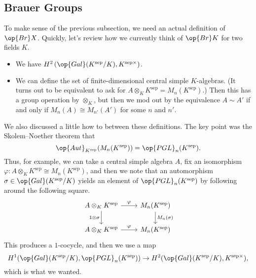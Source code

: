 \documentclass[../notes.tex]{subfiles}
\begin{document}
\subsection{Brauer Groups}
To make sense of the previous subsection, we need an actual definition of $\op{Br}X$. Quickly, let's review how we currently think of $\op{Br}K$ for two fields $K$.
\begin{itemize}
	\item We have $H^2\left(\op{Gal}(K^{\mathrm{sep}}/K),K^{\mathrm{sep}\times}\right)$.
	\item We can define the set of finite-dimensional central simple $K$-algebras. (It turns out to be equivalent to ask for $A\otimes_KK^{\mathrm{sep}}=M_n(K^{\mathrm{sep}})$.) Then this has a group operation by $\otimes_K$, but then we mod out by the equivalence $A\sim A'$ if and only if $M_n(A)\cong M_{n'}(A')$ for some $n$ and $n'$.
\end{itemize}
We also discussed a little how to between these definitions. The key point was the Skolem--Noether theorem that
\[\op{Aut}_{K^{\mathrm{sep}}}(M_n(K^{\mathrm{sep}}))=\op{PGL}_n(K^{\mathrm{sep}}).\]
Thus, for example, we can take a central simple algebra $A$, fix an isomorphism $\varphi\colon A\otimes_KK^{\mathrm{sep}}\cong M_n(K^{\mathrm{sep}})$, and then we note that an automorphism $\sigma\in\op{Gal}(K^{\mathrm{sep}}/K)$ yields an element of $\op{PGL}_n(K^{\mathrm{sep}})$ by following around the following square.
\[\begin{tikzcd}
	{A\otimes_KK^{\mathrm{sep}}} & {M_n(K^{\mathrm{sep}})} \\
	{A\otimes_KK^{\mathrm{sep}}} & {M_n(K^{\mathrm{sep}})}
	\arrow["1\otimes\sigma"', from=1-1, to=2-1]
	\arrow["{M_n(\sigma)}", from=1-2, to=2-2]
	\arrow["\varphi", from=1-1, to=1-2]
	\arrow["\varphi", from=2-1, to=2-2]
\end{tikzcd}\]
This produces a $1$-cocycle, and then we use a map
\[H^1(\op{Gal}(K^{\mathrm{sep}}/K),\op{PGL}_n(K^{\mathrm{sep}}))\to H^2(\op{Gal}(K^{\mathrm{sep}}/K),K^{\mathrm{sep}\times}),\]
which is what we wanted.
\end{document}
